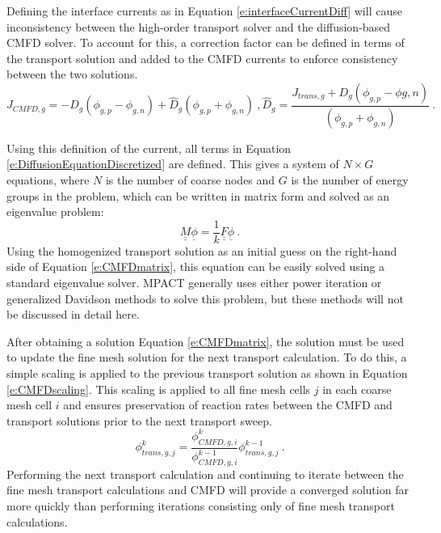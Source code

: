 Defining the interface currents as in Equation \ref{e:interfaceCurrentDiff} will cause inconsistency between the high-order transport solver and the diffusion-based CMFD solver.  To account for this, a correction factor can be defined in terms of the transport solution and added to the CMFD currents to enforce consistency between the two solutions.
\begin{subequations}\label{e:CMFDcouplingCoeffs}
\begin{equation}\label{e:interfaceCurrentCMFD}
J_{CMFD,g} = -D_g\left(\phi_{g,p} - \phi_{g,n}\right) + \hat{D}_g\left(\phi_{g,p} + \phi_{g,n}\right)\ ,
\end{equation}
\begin{equation}\label{e:dhat}
\hat{D}_g = \frac{J_{trans,g} + D_g\left(\phi_{g,p} - \phi{g,n}\right)}{\left(\phi_{g,p} + \phi_{g,n}\right)}\ .
\end{equation}
\end{subequations}

Using this definition of the current, all terms in Equation \ref{e:DiffusionEquationDiscretized} are defined.  This gives a system of $N\times G$ equations, where $N$ is the number of coarse nodes and $G$ is the number of energy groups in the problem, which can be written in matrix form and solved as an eigenvalue problem:
\begin{equation}\label{e:CMFDmatrix}
\underline{\underline{M}}\underline{\phi}=\frac{1}{k}\underline{\underline{F}}\underline{\phi}\ .
\end{equation}
Using the homogenized transport solution as an initial guess on the right-hand side of Equation \ref{e:CMFDmatrix}, this equation can be easily solved using a standard eigenvalue solver.  MPACT generally uses either power iteration or generalized Davidson methods to solve this problem, but these methods will not be discussed in detail here.

After obtaining a solution Equation \ref{e:CMFDmatrix}, the solution must be used to update the fine mesh solution for the next transport calculation.  To do this, a simple scaling is applied to the previous transport solution as shown in Equation \ref{e:CMFDscaling}.  This scaling is applied to all fine mesh cells $j$ in each coarse mesh cell $i$ and ensures preservation of reaction rates between the CMFD and transport solutions prior to the next transport sweep.
\begin{equation}\label{e:CMFDscaling}
\phi_{trans,g,j}^{k}=\frac{\phi_{CMFD,g,i}^k}{\phi_{CMFD,g,i}^{k-1}}\phi_{trans,g,j}^{k-1}\ .
\end{equation}
Performing the next transport calculation and continuing to iterate between the fine mesh transport calculations and CMFD will provide a converged solution far more quickly than performing iterations consisting only of fine mesh transport calculations.

